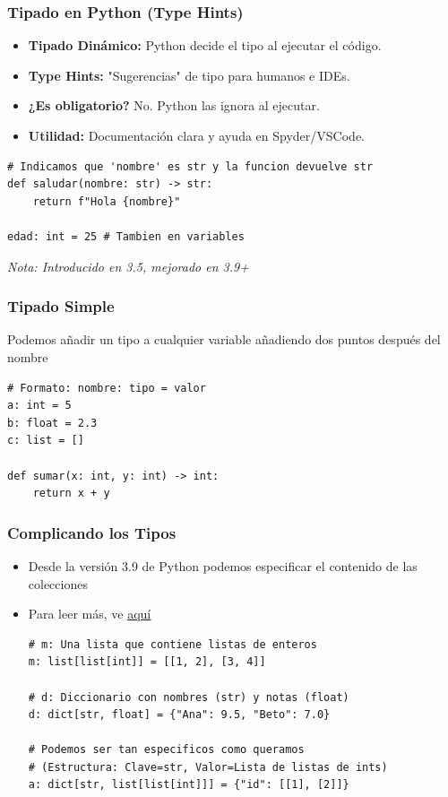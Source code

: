 \documentclass[11pt]{beamer}
\begin{document}
\begin{frame}[fragile]\frametitle{Tipado en Python (Type Hints)}
\begin{itemize}
    \item \textbf{Tipado Dinámico:} Python decide el tipo al ejecutar el código.
    \item \textbf{Type Hints:} "Sugerencias" de tipo para humanos e IDEs.
    \item \textbf{¿Es obligatorio?} No. Python las ignora al ejecutar.
    \item \textbf{Utilidad:} Documentación clara y ayuda en Spyder/VSCode.
\end{itemize}
\begin{lstlisting}[basicstyle=\scriptsize]
# Indicamos que 'nombre' es str y la funcion devuelve str
def saludar(nombre: str) -> str:
    return f"Hola {nombre}"

edad: int = 25 # Tambien en variables
\end{lstlisting}
\scriptsize \textit{Nota: Introducido en 3.5, mejorado en 3.9+}
\end{frame}

\begin{frame}[fragile]\frametitle{Tipado Simple}
\begin{block}{}
\centering Podemos añadir un tipo a cualquier variable añadiendo dos puntos después del nombre
\end{block}
\begin{lstlisting}[basicstyle=\scriptsize]
# Formato: nombre: tipo = valor
a: int = 5
b: float = 2.3
c: list = []

def sumar(x: int, y: int) -> int:
    return x + y
\end{lstlisting}
\end{frame}

\begin{frame}[fragile]\frametitle{Complicando los Tipos}
\begin{itemize}
\item Desde la versión 3.9 de Python podemos especificar el contenido de las colecciones
\item Para leer más, ve \href{https://mypy.readthedocs.io/en/stable/cheat_sheet_py3.html}{\color{blue}\underline{aquí}}
\begin{lstlisting}[basicstyle=\scriptsize]
# m: Una lista que contiene listas de enteros
m: list[list[int]] = [[1, 2], [3, 4]]

# d: Diccionario con nombres (str) y notas (float)
d: dict[str, float] = {"Ana": 9.5, "Beto": 7.0}

# Podemos ser tan especificos como queramos
# (Estructura: Clave=str, Valor=Lista de listas de ints)
a: dict[str, list[list[int]]] = {"id": [[1], [2]]}
\end{lstlisting}
\end{itemize}
\end{frame}
\end{document}
